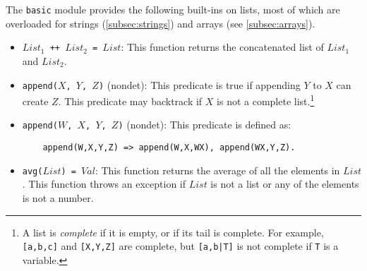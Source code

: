 The \texttt{basic} module provides the following built-ins on lists, most of which are overloaded for strings (\ref{subsec:strings}) and arrays (see \ref{subsec:arrays}).
\begin{itemize}
\item \texttt{$List_1$ ++ $List_2$ = $List$}: This function returns the concatenated list of $List_1$ and $List_2$. 
\item \texttt{append($X$, $Y$, $Z$)} (nondet): This predicate is true if appending $Y$ to $X$ can create $Z$. This predicate may backtrack if $X$ is not a complete list.\footnote{A list is \emph{complete}  if it is empty, or if its tail is complete. For example, \texttt{[a,b,c]} and \texttt{[X,Y,Z]} are complete, but \texttt{[a,b|T]} is not complete if \texttt{T} is a variable.}

\item \texttt{append($W$, $X$, $Y$, $Z$)} (nondet): This predicate is defined as:
\begin{verbatim}
    append(W,X,Y,Z) => append(W,X,WX), append(WX,Y,Z).
\end{verbatim}

\item \texttt{avg($List$) = $Val$}: This function returns the average of all the elements in $List$. This function throws an exception if $List$ is not a list or any of the elements is not a number. 


\end{itemize}
